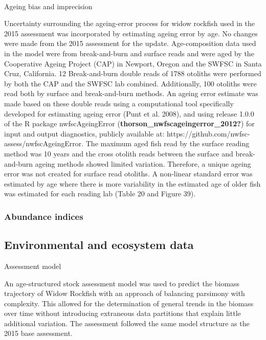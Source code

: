 \documentclass[
]{scrartcl}
\makeatletter
\let\oldparagraph\paragraph
\renewcommand{\paragraph}{
    \@ifstar
      \xxxParagraphStar
      \xxxParagraphNoStar
  }
\newcommand{\xxxParagraphStar}[1]{\oldparagraph*{#1}\mbox{}}
\newcommand{\xxxParagraphNoStar}[1]{\oldparagraph{#1}\mbox{}}
\makeatother
\begin{document}
\paragraph{Ageing bias and
imprecision}\label{ageing-bias-and-imprecision}

Uncertainty surrounding the ageing-error process for widow rockfish used
in the 2015 assessment was incorporated by estimating ageing error by
age. No changes were made from the 2015 assessment for the update.
Age-composition data used in the model were from break-and-burn and
surface reads and were aged by the Cooperative Ageing Project (CAP) in
Newport, Oregon and the SWFSC in Santa Cruz, California. 12
Break-and-burn double reads of 1788 otoliths were performed by both the
CAP and the SWFSC lab combined. Additionally, 100 otoliths were read
both by surface and break-and-burn methods. An ageing error estimate was
made based on these double reads using a computational tool specifically
developed for estimating ageing error (Punt et al. 2008), and using
release 1.0.0 of the R package nwfscAgeingError
(\textbf{thorson\_nwfscageingerror\_2012?}) for input and output
diagnostics, publicly available at: https://github.com/nwfsc-
assess/nwfscAgeingError. The maximum aged fish read by the surface
reading method was 10 years and the cross otolith reads between the
surface and break-and-burn ageing methods showed limited variation.
Therefore, a unique ageing error was not created for surface read
otoliths. A non-linear standard error was estimated by age where there
is more variability in the estimated age of older fish was estimated for
each reading lab (Table 20 and Figure 39).

\subsubsection{Abundance indices}\label{abundance-indices}

\subsection{Environmental and ecosystem
data}\label{environmental-and-ecosystem-data}

\newpage{}

Assessment model

An age-structured stock assessment model was used to predict the biomass
trajectory of Widow Rockfish with an approach of balancing parsimony
with complexity. This allowed for the determination of general trends in
the biomass over time without introducing extraneous data partitions
that explain little additional variation. The assessment followed the
same model structure as the 2015 base assessment.
\end{document}
